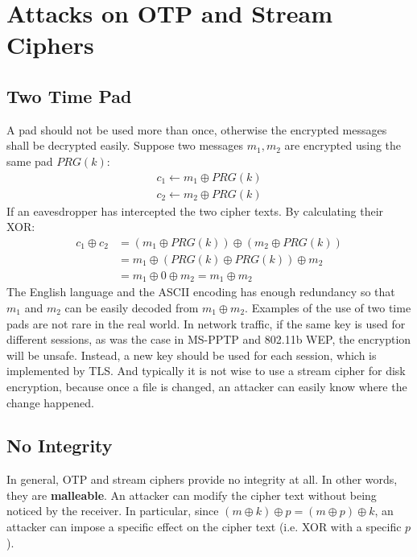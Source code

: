 \section{Attacks on OTP and Stream Ciphers}
\subsection{Two Time Pad}
A pad should not be used more than once, otherwise the encrypted messages shall be decrypted easily. Suppose two messages $m_1,m_2$ are encrypted using the same pad $PRG(k)$:
\begin{align*}
c_1\leftarrow m_1\oplus PRG(k)\\
c_2\leftarrow m_2\oplus PRG(k)
\end{align*}
If an eavesdropper has intercepted the two cipher texts. By calculating their XOR:
\begin{align*}
c_1\oplus c_2&=(m_1\oplus PRG(k))\oplus(m_2\oplus PRG(k))\\
&=m_1\oplus(PRG(k)\oplus PRG(k))\oplus m_2\\
&=m_1\oplus 0\oplus m_2=m_1\oplus m_2
\end{align*}
The English language and the ASCII encoding has enough redundancy so that $m_1$ and $m_2$ can be easily decoded from $m_1\oplus m_2$. Examples of the use of two time pads are not rare in the real world. In network traffic, if the same key is used for different sessions, as was the case in MS-PPTP and 802.11b WEP, the encryption will be unsafe. Instead, a new key should be used for each session, which is implemented by TLS. And typically it is not wise to use a stream cipher for disk encryption, because once a file is changed, an attacker can easily know where the change happened. 
\subsection{No Integrity}
In general, OTP and stream ciphers provide no integrity at all. In other words, they are \textbf{malleable}. An attacker can modify the cipher text without being noticed by the receiver. In particular, since $(m\oplus k)\oplus p=(m\oplus p)\oplus k$, an attacker can impose a specific effect on the cipher text (i.e. XOR with a specific $p$).
